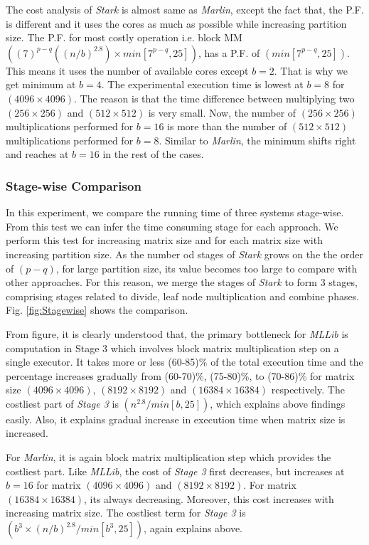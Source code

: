 The cost analysis of \textit{Stark} is almost same as \textit{Marlin}, except the fact that, the P.F. is different and it uses the cores as much as possible while increasing partition size. The P.F. for most costly operation i.e. block MM $((7)^{p-q}((n/b)^{2.8})\times min[7^{p-q},25])$, has a P.F. of $(min[7^{p-q},25])$. This means it uses the number of available cores except $b=2$. That is why we get minimum at $b=4$. The experimental execution time is lowest at $b=8$ for $(4096\times 4096)$. The reason is that the time difference between multiplying two $(256\times 256)$ and $(512\times 512)$ is very small. Now, the number of $(256\times 256)$ multiplications performed for $b=16$ is more than the number of $(512\times 512)$ multiplications performed for $b=8$. Similar to \textit{Marlin}, the minimum shifts right and reaches at $b=16$ in the rest of the cases.

\subsubsection{Stage-wise Comparison}
In this experiment, we compare the running time of three systems stage-wise. From this test we can infer the time consuming stage for each approach. We perform this test for increasing matrix size and for each matrix size with increasing partition size. As the number od stages of \textit{Stark} grows on the the order of $(p-q)$, for large partition size, its value becomes too large to compare with other approaches. For this reason, we merge the stages of \textit{Stark} to form $3$ stages, comprising stages related to divide, leaf node multiplication and combine phases. Fig. \ref{fig:Stagewise} shows the comparison.

From figure, it is clearly understood that, the primary bottleneck for \textit{MLLib} is computation in Stage 3 which involves block matrix multiplication step on a single executor. It takes more or less (60-85)\% of the total execution time and the percentage increases gradually from (60-70)\%, (75-80)\%, to (70-86)\% for matrix size $(4096\times 4096)$, $(8192\times 8192)$ and $(16384\times 16384)$ respectively. The costliest part of \textit{Stage 3} is $(n^{2.8}/min[b,25])$, which explains above findings easily. Also, it explains gradual increase in execution time when matrix size is increased.

For \textit{Marlin}, it is again block matrix multiplication step which provides the costliest part. Like \textit{MLLib}, the cost of \textit{Stage 3} first decreases, but increases at $b=16$ for matrix $(4096\times 4096)$ and $(8192\times 8192)$. For matrix $(16384\times 16384)$, its always decreasing. Moreover, this cost increases with increasing matrix size. The costliest term for \textit{Stage 3} is $(b^{3}\times (n/b)^{2.8}/min[b^{3},25])$, again explains above.

